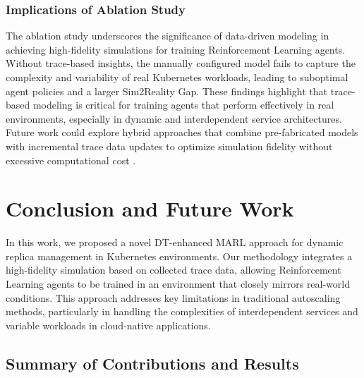 \documentclass[conference]{IEEEtran}
\begin{document}
\subsubsection{Implications of Ablation Study}

The ablation study underscores the significance of data-driven modeling in achieving high-fidelity simulations for training Reinforcement Learning agents. Without trace-based insights, the manually configured model fails to capture the complexity and variability of real Kubernetes workloads, leading to suboptimal agent policies and a larger Sim2Reality Gap. These findings highlight that trace-based modeling is critical for training agents that perform effectively in real environments, especially in dynamic and interdependent service architectures. Future work could explore hybrid approaches that combine pre-fabricated models with incremental trace data updates to optimize simulation fidelity without excessive computational cost \cite{wu_multi_objective_rl}.

\section{Conclusion and Future Work}
\label{sec:conclusion}

In this work, we proposed a novel DT-enhanced MARL approach for dynamic replica management in Kubernetes environments. Our methodology integrates a high-fidelity simulation based on collected trace data, allowing Reinforcement Learning agents to be trained in an environment that closely mirrors real-world conditions. This approach addresses key limitations in traditional autoscaling methods, particularly in handling the complexities of interdependent services and variable workloads in cloud-native applications.

\subsection{Summary of Contributions and Results}
\end{document}
